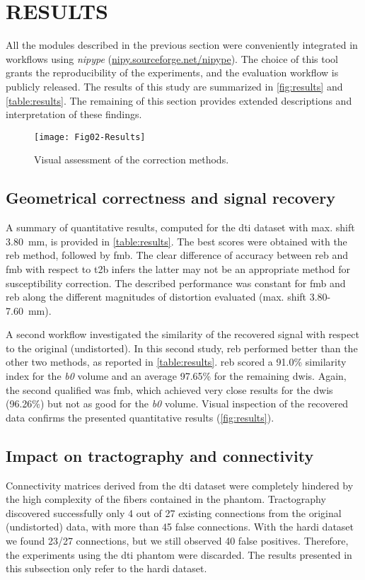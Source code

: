 \section{RESULTS}
\label{sec:results}
All the modules described in the previous section were
  conveniently integrated in workflows using \emph{nipype} %
  (\url{nipy.sourceforge.net/nipype}).
The choice of this tool grants the reproducibility of the experiments,
  and the evaluation workflow is publicly released.
The results of this study are summarized in \autoref{fig:results} and
  \autoref{table:results}.
The remaining of this section provides extended descriptions and interpretation of these
  findings.
\begin{figure*}[tp]
   \centering
   \texttt{[image: Fig02-Results]}
   \caption{Visual assessment of the correction methods.}
   \label{fig:results}
\end{figure*}


\subsection{Geometrical correctness and signal recovery}\label{sec:results_geometry}
A summary of quantitative results, computed for the \gls*{dti} dataset with max. shift 3.80~mm,
  is provided in \autoref{table:results}.
The best scores were obtained with the \gls*{reb} method, followed by \gls*{fmb}.
The clear difference of accuracy between \gls*{reb} and \gls*{fmb} with respect to \gls*{t2b}
  infers the latter may not be an appropriate method for susceptibility correction.
The described performance was constant for \gls*{fmb} and \gls*{reb} along the different magnitudes 
  of distortion evaluated (max. shift 3.80-7.60~mm).


A second workflow investigated the similarity of the recovered signal with respect to the original
  (undistorted).
In this second study, \gls*{reb} performed better than the other two methods, as reported in
  \autoref{table:results}.
\Gls*{reb} scored a 91.0\% similarity index for the \textit{b0} volume and an average 97.65\%
  for the remaining \glspl*{dwi}.
Again, the second qualified was \gls*{fmb}, which achieved very close results for the \glspl*{dwi}
  (96.26\%) but not as good for the \textit{b0} volume.
Visual inspection of the recovered data confirms the presented quantitative results 
  (\autoref{fig:results}).


\subsection{Impact on tractography and connectivity}
Connectivity matrices derived from the \gls*{dti} dataset were completely hindered by the high complexity
  of the fibers contained in the phantom.
Tractography discovered successfully only 4 out of 27 existing connections from the original (undistorted) data,
  with more than 45 false connections.
With the \gls*{hardi} dataset we found 23/27 connections, but we still observed 40 false positives.
Therefore, the experiments using the \gls*{dti} phantom were discarded.
The results presented in this subsection only refer to the \gls*{hardi} dataset.

